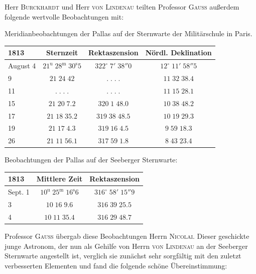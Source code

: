 \par\indent Herr \textsc{Burckhardt} und Herr \textsc{von Lindenau} teilten Professor \textsc{Gauss} außerdem folgende wertvolle Beobachtungen mit:

\begin{center}Meridianbeobachtungen der Pallas auf der Sternwarte der Militärschule in Paris.\end{center}
\begin{center}\fontsize{10}{12}\selectfont\setlength{\tabcolsep}{5pt}\renewcommand{\arraystretch}{1.15}\begin{tabular}{l|c|c|c}
1813 & Sternzeit & Rektaszension & Nördl. Deklination\\\hline
August 4 & $21^{\mathrm u}\;28^{\mathrm m}\;30^{\mathrm s}5$ & $322^\circ\;7'\;38''0$ & $12^\circ\;11'\;58''5$\\
9 & $21\;24\;42$ & $.\;.\;.\;.$ & $11\;32\;38.4$\\
11 & $.\;.\;.\;.$ & $.\;.\;.\;.$ & $11\;15\;28.1$\\
15 & $21\;20\;7.2$ & $320\;1\;48.0$ & $10\;38\;48.2$\\
17 & $21\;18\;35.2$ & $319\;38\;48.5$ & $10\;19\;29.3$\\
19 & $21\;17\;4.3$ & $319\;16\;4.5$ & $9\;59\;18.3$\\
26 & $21\;11\;56.1$ & $317\;59\;1.8$ & $8\;43\;23.4$\\
\end{tabular}\end{center}

\begin{center}\leavevmode{}Beobachtungen der Pallas auf der Seeberger Sternwarte:\end{center}

\begin{center}\fontsize{10}{12}\selectfont\setlength{\tabcolsep}{5pt}\renewcommand{\arraystretch}{1.15}\begin{tabular}{l|c|c}
1813 & Mittlere Zeit & Rektaszension\\\hline
Sept. 1 & $10^{\mathrm u}\;25^{\mathrm m}\;16^{\mathrm s}6$ & $316^\circ\;58'\;15''9$\\
3 & $10\;16\;9.6$ & $316\;39\;25.5$\\
4 & $10\;11\;35.4$ & $316\;29\;48.7$\\
\end{tabular}\end{center}

\par\indent Professor \textsc{Gauss} übergab diese Beobachtungen Herrn \textsc{Nicolai}. Dieser geschickte junge Astronom, der nun als Gehilfe von Herrn \textsc{von Lindenau} an der Seeberger Sternwarte angestellt ist, verglich sie zunächst sehr sorgfältig mit den zuletzt verbesserten Elementen und fand die folgende schöne Übereinstimmung:

